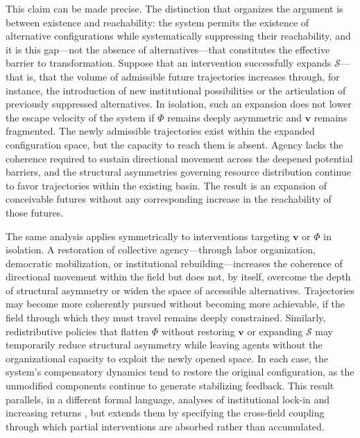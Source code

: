 \documentclass[11pt, a4paper]{article}
\begin{document}
This claim can be made precise. The distinction that organizes the argument is between existence and reachability: the system permits the existence of alternative configurations while systematically suppressing their reachability, and it is this gap---not the absence of alternatives---that constitutes the effective barrier to transformation. Suppose that an intervention successfully expands $\mathcal{S}$---that is, that the volume of admissible future trajectories increases through, for instance, the introduction of new institutional possibilities or the articulation of previously suppressed alternatives. In isolation, such an expansion does not lower the escape velocity of the system if $\Phi$ remains deeply asymmetric and $\mathbf{v}$ remains fragmented. The newly admissible trajectories exist within the expanded configuration space, but the capacity to reach them is absent. Agency lacks the coherence required to sustain directional movement across the deepened potential barriers, and the structural asymmetries governing resource distribution continue to favor trajectories within the existing basin. The result is an expansion of conceivable futures without any corresponding increase in the reachability of those futures.

The same analysis applies symmetrically to interventions targeting $\mathbf{v}$ or $\Phi$ in isolation. A restoration of collective agency---through labor organization, democratic mobilization, or institutional rebuilding---increases the coherence of directional movement within the field but does not, by itself, overcome the depth of structural asymmetry or widen the space of accessible alternatives. Trajectories may become more coherently pursued without becoming more achievable, if the field through which they must travel remains deeply constrained. Similarly, redistributive policies that flatten $\Phi$ without restoring $\mathbf{v}$ or expanding $\mathcal{S}$ may temporarily reduce structural asymmetry while leaving agents without the organizational capacity to exploit the newly opened space. In each case, the system's compensatory dynamics tend to restore the original configuration, as the unmodified components continue to generate stabilizing feedback. This result parallels, in a different formal language, analyses of institutional lock-in and increasing returns \cite{arthur1994}, but extends them by specifying the cross-field coupling through which partial interventions are absorbed rather than accumulated.
\end{document}
